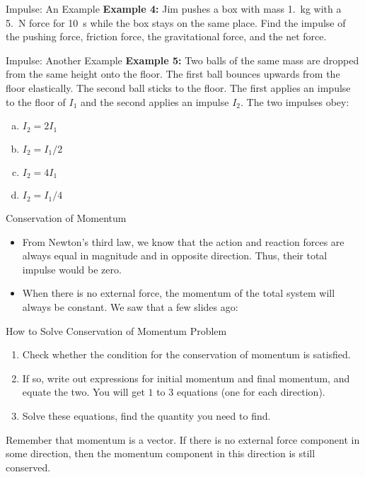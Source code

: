 \documentclass[12pt,compress,aspectratio=169]{beamer}
\newcommand{\mb}[1]{\ensuremath\mathbf{#1}}
\newcommand{\eq}[2]{\vspace{#1}{\Large\begin{displaymath}#2\end{displaymath}}}
\begin{document}
\begin{frame}{Impulse: An Example}
  \textbf{Example 4:} Jim pushes a box with mass \SI{1.}{\kilo\gram} with a
  \SI{5.}{\newton} force for \SI{10}{\second} while the box stays on the same
  place. Find the impulse of the pushing force, friction force, the
  gravitational force, and the net force.
\end{frame}



\begin{frame}{Impulse: Another Example}
  \textbf{Example 5:} Two balls of the same mass are dropped from the same
  height onto the floor. The first ball bounces upwards from the floor
  elastically. The second ball sticks to the floor. The first applies an
  impulse to the floor of $I_1$ and the second applies an impulse $I_2$. The
  two impulses obey:
  \begin{enumerate}[(a)]
  \item $I_2=2I_1$
  \item $I_2=I_1/2$
  \item $I_2=4I_1$
  \item $I_2=I_1/4$
  \end{enumerate}
\end{frame}



\begin{frame}{Conservation of Momentum}
  \begin{itemize}
  \item From Newton's third law, we know that the action and reaction forces are
    always equal in magnitude and in opposite direction. Thus, their total
    impulse would be zero. 
    
  \item When there is no external force, the momentum of the total system will
    always be constant. We saw that a few slides ago:

    \eq{-.2in}{
      \sum\mb{p}(t_1)=\sum\mb{p}(t_2)
    }
  \end{itemize}
\end{frame}



\begin{frame}{How to Solve Conservation of Momentum Problem}
  \begin{enumerate}
  \item Check whether the condition for the conservation of momentum is
    satisfied.
  \item If so, write out expressions for initial momentum and final momentum,
    and equate the two. You will get $1$ to $3$ equations (one for each
    direction).
  \item Solve these equations, find the quantity you need to find.
  \end{enumerate}
  Remember that momentum is a vector. If there is no external force component
  in some direction, then the momentum component in this direction is still
  conserved.
\end{frame}
\end{document}
